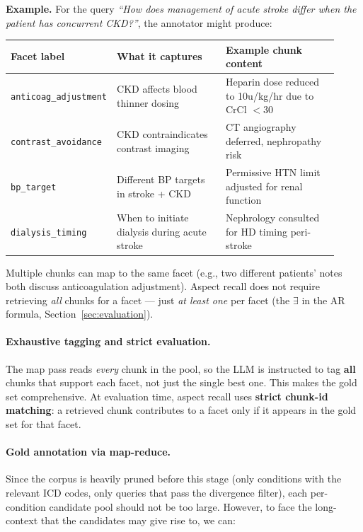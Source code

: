 \documentclass[11pt,a4paper]{article}
\begin{document}
\begin{enumerate}[leftmargin=*, itemsep=2mm]
	      \smallskip
	      \textbf{Example.} For the query \emph{``How does management of acute stroke differ when the patient has concurrent CKD?''}, the annotator might produce:

	      \smallskip
	      \small
	      \begin{tabular}{@{}p{0.2\linewidth}p{0.35\linewidth}p{0.37\linewidth}@{}}
		      \textbf{Facet label}          & \textbf{What it captures}                     & \textbf{Example chunk content}                       \\
		      \hline
		      \texttt{anticoag\_adjustment} & CKD affects blood thinner dosing              & Heparin dose reduced to 10u/kg/hr due to CrCl $< 30$ \\[3pt]
		      \texttt{contrast\_avoidance}  & CKD contraindicates contrast imaging          & CT angiography deferred, nephropathy risk            \\[3pt]
		      \texttt{bp\_target}           & Different BP targets in stroke + CKD          & Permissive HTN limit adjusted for renal function     \\[3pt]
		      \texttt{dialysis\_timing}     & When to initiate dialysis during acute stroke & Nephrology consulted for HD timing peri-stroke       \\
	      \end{tabular}
	      \normalsize
	      \smallskip

	      Multiple chunks can map to the same facet (e.g., two different patients' notes both discuss anticoagulation adjustment). Aspect recall does not require retrieving \emph{all} chunks for a facet --- just \emph{at least one} per facet (the $\exists$ in the AR formula, Section~\ref{sec:evaluation}).

	      \paragraph{Exhaustive tagging and strict evaluation.}
	      The map pass reads \emph{every} chunk in the pool, so the LLM is instructed to tag \textbf{all} chunks that support each facet, not just the single best one. This makes the gold set comprehensive. At evaluation time, aspect recall uses \textbf{strict chunk-id matching}: a retrieved chunk contributes to a facet only if it appears in the gold set for that facet.

	      \paragraph{Gold annotation via map-reduce.}
	      Since the corpus is heavily pruned before this stage (only conditions with the relevant ICD codes, only queries that pass the divergence filter), each per-condition candidate pool should not be too large. However, to face the long-context that the candidates may give rise to, we can:


\end{enumerate}
\end{document}
